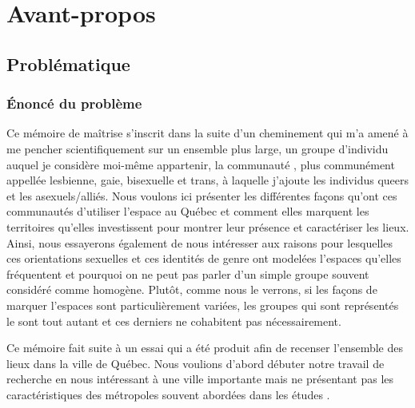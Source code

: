 \chapter*{Avant-propos}         %

\section{Problématique}
\label{sec:problematique}


\subsection{Énoncé du problème}
\label{sub:enonce_du_probleme}

Ce mémoire de maîtrise s'inscrit dans la suite d'un cheminement qui m'a amené à me pencher scientifiquement sur un ensemble plus large, un groupe d'individu auquel je considère moi-même appartenir, la communauté \lgbt{}, plus communément appellée lesbienne, gaie, bisexuelle et trans, à laquelle j'ajoute les individus queers et les asexuels/alliés.
Nous voulons ici présenter les différentes façons qu'ont ces communautés d'utiliser l'espace au Québec et comment elles marquent les territoires qu'elles investissent pour montrer leur présence et caractériser les lieux.
Ainsi, nous essayerons également de nous intéresser aux raisons pour lesquelles ces orientations sexuelles et ces identités de genre ont modelées l'espaces qu'elles fréquentent et pourquoi on ne peut pas parler d'un simple groupe souvent considéré comme homogène.
Plutôt, comme nous le verrons, si les façons de marquer l'espaces sont particulièrement variées, les groupes qui sont représentés le sont tout autant et ces derniers ne cohabitent pas nécessairement.

Ce mémoire fait suite à un essai qui a été produit afin de recenser l'ensemble des lieux \lgbt{} dans la ville de Québec.
Nous voulions d'abord débuter notre travail de recherche en nous intéressant à une ville importante mais ne présentant pas les caractéristiques des métropoles souvent abordées dans les études \lgbt{}.

